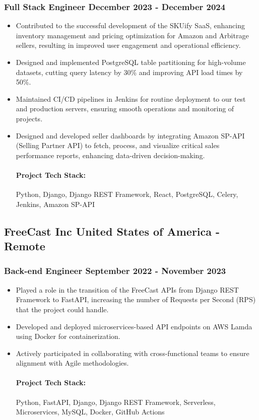 \documentclass[11pt]{article} %
\begin{document}
\subsubsection{Full Stack Engineer \hfill  December 2023 - December 2024}
\begin{itemize}
    \item Contributed to the successful development of the SKUify SaaS, enhancing inventory management and pricing optimization for Amazon and Arbitrage sellers, resulting in improved user engagement and operational efficiency.
    \item Designed and implemented PostgreSQL table partitioning for high-volume datasets, cutting query latency by 30\% and improving API load times by 50\%.
    \item Maintained CI/CD pipelines in Jenkins for routine deployment to our test and production servers, ensuring smooth operations and monitoring of projects.
    \item Designed and developed seller dashboards by integrating Amazon SP-API (Selling Partner API) to fetch, process, and visualize critical sales performance reports, enhancing data-driven decision-making.

    \paragraph{Project Tech Stack:} Python, Django, Django REST Framework, React, PostgreSQL, Celery, Jenkins, Amazon SP-API
\end{itemize}

\subsection{FreeCast Inc \hfill United States of America - Remote}
\subsubsection{Back-end Engineer \hfill  September 2022 - November 2023}
\begin{itemize}
    \item Played a role in the transition of the FreeCast APIs from Django REST Framework to FastAPI, increasing the number of Requests per Second (RPS) that the project could handle.
    \item Developed and deployed microservices-based API endpoints on AWS Lamda using Docker for containerization.
    \item Actively participated in collaborating with cross-functional teams to ensure alignment with Agile methodologies.

    \paragraph{Project Tech Stack:} Python, FastAPI, Django, Django REST Framework, Serverless, Microservices, MySQL, Docker, GitHub Actions
\end{itemize}
\end{document}
